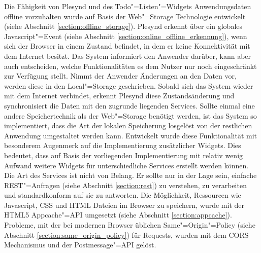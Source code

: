 Die Fähigkeit von Plesynd und des Todo"=Listen"=Widgets Anwendungsdaten offline vorzuhalten wurde auf Basis der Web"=Storage Technologie entwickelt (siehe Abschnitt \ref{section:offline_storage}). Plesynd erkennt über ein globales Javascript"=Event (siehe Abschnitt \ref{section:online_offline_erkennung}), wenn sich der Browser in einem Zustand befindet, in dem er keine Konnektivität mit dem Internet besitzt. Das System informiert den Anwender darüber, kann aber auch entscheiden, welche Funktionalitäten es dem Nutzer nur noch eingeschränkt zur Verfügung stellt. Nimmt der Anwender Änderungen an den Daten vor, werden diese in den Local"=Storage geschrieben. Sobald sich das System wieder mit dem Internet verbindet, erkennt Plesynd diese Zustandsänderung und synchronisiert die Daten mit den zugrunde liegenden Services. Sollte einmal eine andere Speichertechnik als der Web"=Storage benötigt werden, ist das System so implementiert, dass die Art der lokalen Speicherung losgelöst von der restlichen Anwendung umgestaltet werden kann. Entwickelt wurde diese Funktionalität mit besonderem Augenmerk auf die Implementierung zusätzlicher Widgets. Dies bedeutet, dass auf Basis der vorliegenden Implementierung mit relativ wenig Aufwand weitere Widgets für unterschiedliche Services erstellt werden können. Die Art des Services ist nicht von Belang. Er sollte nur in der Lage sein, einfache REST"=Anfragen (siehe Abschnitt \ref{section:rest}) zu verstehen, zu verarbeiten und standardkonform auf sie zu antworten. Die Möglichkeit, Ressourcen wie Javascript, \ac{CSS} und \ac{HTML} Dateien im Browser zu speichern, wurde mit der \ac{HTML}5 Appcache"=\ac{API} umgesetzt (siehe Abschnitt \ref{section:appcache}). Probleme, mit der bei modernen Browser üblichen Same"=Origin"=Policy (siehe Abschnitt \ref{section:same_origin_policy}) für Requests, wurden mit dem \ac{CORS} Mechanismus und der Postmessage"=\ac{API} gelöst. 

